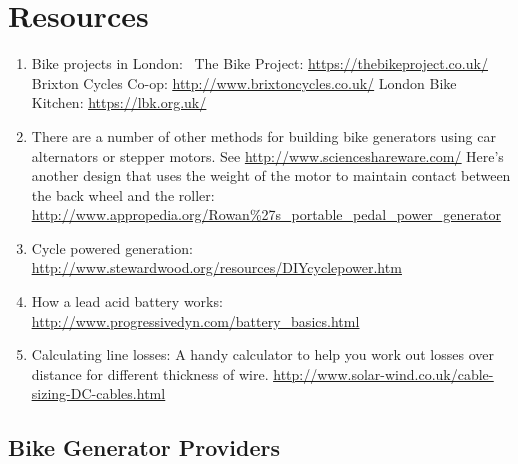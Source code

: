 \documentclass{article}
\theoremstyle{definition}
\theoremstyle{definition}
\theoremstyle{remark}
\begin{document}


\section{Resources} %
\label{sec:resources}

  \begin{enumerate}
    \item Bike projects in London:  \newline
      The Bike Project: \href{https://thebikeproject.co.uk/}{\underline{https://thebikeproject.co.uk/}} \newline
      Brixton Cycles Co-op: \href{http://www.brixtoncycles.co.uk/}{\underline{http://www.brixtoncycles.co.uk/}} \newline
      London Bike Kitchen: \href{https://lbk.org.uk/}{\underline{https://lbk.org.uk/}} \newline
    \item There are a number of other methods for building bike generators using car alternators or stepper motors. See \href{http://www.scienceshareware.com/}{\underline{http://www.scienceshareware.com/}} \newline
      Here’s another design that uses the weight of the motor to maintain contact between the back wheel and the roller: \href{http://www.appropedia.org/Rowan\%27s\_portable\_pedal\_power\_generator}{\underline{http://www.appropedia.org/Rowan\%27s\_portable\_pedal\_power\_generator}}
    \item Cycle powered generation: \href{http://www.stewardwood.org/resources/DIYcyclepower.htm}{\underline{http://www.stewardwood.org/resources/DIYcyclepower.htm}}
    \item How a lead acid battery works: \href{http://www.progressivedyn.com/battery_basics.html}{\underline{http://www.progressivedyn.com/battery\_basics.html}}
    \item Calculating line losses: A handy calculator to help you work out losses over distance for different thickness of wire. \href{http://www.solar-wind.co.uk/cable-sizing-DC-cables.html}{\underline{http://www.solar-wind.co.uk/cable-sizing-DC-cables.html}}
  \end{enumerate}

  \subsection{Bike Generator Providers} %
  \label{sub:bike_generator_providers}
  
\end{document}
